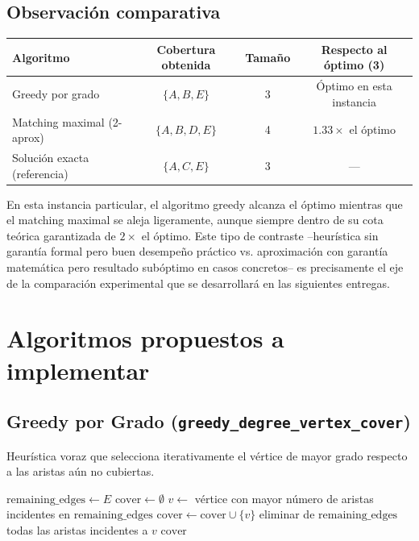 \documentclass[11pt,a4paper]{article}
\begin{document}
\subsection{Observación comparativa}
\begin{center}
\begin{tabular}{lccc}
	\toprule
	\textbf{Algoritmo} & \textbf{Cobertura obtenida} & \textbf{Tamaño} & \textbf{Respecto al óptimo (3)} \\
	\midrule
	Greedy por grado         & $\{A, B, E\}$    & 3 & Óptimo en esta instancia \\
	Matching maximal (2-aprox) & $\{A, B, D, E\}$ & 4 & $1.33\times$ el óptimo \\
	Solución exacta (referencia) & $\{A, C, E\}$ & 3 & --- \\
	\bottomrule
\end{tabular}
\end{center}

En esta instancia particular, el algoritmo greedy alcanza el óptimo mientras que el
matching maximal se aleja ligeramente, aunque siempre dentro de su cota teórica garantizada
de $2\times$ el óptimo. Este tipo de contraste --heurística sin garantía formal pero buen
desempeño práctico vs. aproximación con garantía matemática pero resultado subóptimo en
casos concretos-- es precisamente el eje de la comparación experimental que se desarrollará
en las siguientes entregas.

\section{Algoritmos propuestos a implementar}

\subsection{Greedy por Grado (\texttt{greedy\_degree\_vertex\_cover})}
Heurística voraz que selecciona iterativamente el vértice de mayor grado respecto a las
aristas aún no cubiertas.

\begin{algorithm}[H]
\caption{Greedy por Grado}
\begin{algorithmic}[1]
\State $\text{remaining\_edges} \gets E$
\State $\text{cover} \gets \emptyset$
	\State $v \gets$ vértice con mayor número de aristas incidentes en $\text{remaining\_edges}$
	\State $\text{cover} \gets \text{cover} \cup \{v\}$
	\State eliminar de $\text{remaining\_edges}$ todas las aristas incidentes a $v$
\EndWhile
\State \Return $\text{cover}$
\end{algorithmic}
\end{algorithm}
\end{document}

